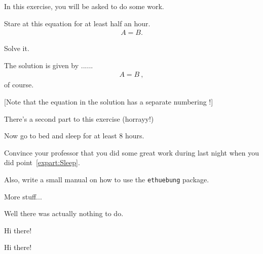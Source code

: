 \documentclass[11pt,a4paper]{article}
\begin{document}
\MakeUebungHeader


In this exercise, you will be asked to do some work.


\begin{exenumerate}
\item Stare at this equation for at least half an hour.
  \begin{align}
    A = B.
  \end{align}

\item Solve it.

  \begin{loesung}
    The solution is given by ...... 
    \begin{align}
      A=B\ ,
    \end{align}
    of course.

    [Note that the equation in the solution has a separate numbering !]
  \end{loesung}
\end{exenumerate}

There's a second part to this exercise (horrayy!)

\begin{exenumerate} %
\item \label{expart:Sleep} Now go to bed and sleep for at least 8 hours.
\item Convince your professor that you did some great work during last night when you did
  point~\ref{expart:Sleep}.
\end{exenumerate}

Also, write a small manual on how to use the \texttt{ethuebung} package.




More stuff...

\begin{solution}
  Well there was actually nothing to do.
\end{solution}


Hi there!


Hi there!
\end{document}
